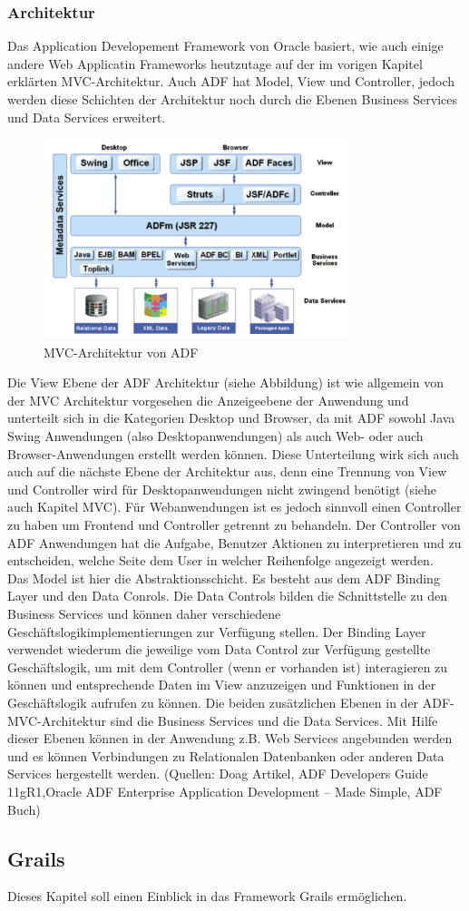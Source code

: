 \subsubsection{Architektur}
Das Application Developement Framework von Oracle basiert, wie auch einige andere Web Applicatin Frameworks heutzutage auf der im vorigen Kapitel erklärten MVC-Architektur. 
Auch ADF hat Model, View und Controller, jedoch werden diese Schichten der Architektur noch durch die Ebenen Business Services und Data Services erweitert.
\begin{figure}[H]
\centering
\includegraphics[width=0.80\textwidth]{img/MVC-ADF3.png}
\caption {MVC-Architektur von ADF}
\end{figure}

Die View Ebene der ADF Architektur (siehe Abbildung) ist wie allgemein von der MVC Architektur vorgesehen die Anzeigeebene der Anwendung und unterteilt sich in die Kategorien Desktop und Browser, da mit ADF sowohl Java Swing Anwendungen (also Desktopanwendungen) als auch Web- oder auch Browser-Anwendungen erstellt werden können. Diese Unterteilung wirk sich auch auch auf die nächste Ebene der Architektur aus, denn eine Trennung von View und Controller wird für Desktopanwendungen nicht zwingend benötigt (siehe auch Kapitel MVC). Für Webanwendungen ist es jedoch sinnvoll einen Controller zu haben um Frontend und Controller getrennt zu behandeln. Der Controller von ADF Anwendungen hat die Aufgabe, Benutzer Aktionen zu interpretieren und zu entscheiden, welche Seite dem User in welcher Reihenfolge angezeigt werden.\\
Das Model ist hier die Abstraktionsschicht. Es besteht aus dem ADF Binding Layer und den Data Conrols. Die Data Controls bilden die Schnittstelle zu den Business Services und können daher verschiedene Geschäftslogikimplementierungen zur Verfügung stellen. Der Binding Layer verwendet wiederum die jeweilige vom Data Control zur Verfügung gestellte Geschäftslogik, um mit dem Controller (wenn er vorhanden ist) interagieren zu können und entsprechende Daten im View anzuzeigen und Funktionen in der Geschäftslogik aufrufen zu können.
Die beiden zusätzlichen Ebenen in der ADF-MVC-Architektur sind die Business Services und die Data Services. Mit Hilfe dieser Ebenen können in der Anwendung z.B. Web Services angebunden werden und es können Verbindungen zu Relationalen Datenbanken oder anderen Data Services hergestellt werden.
(Quellen: Doag Artikel, ADF Developers Guide 11gR1,Oracle ADF Enterprise Application Development – Made Simple, ADF Buch)
\subsection{Grails}
Dieses Kapitel soll einen Einblick in das Framework Grails ermöglichen.
